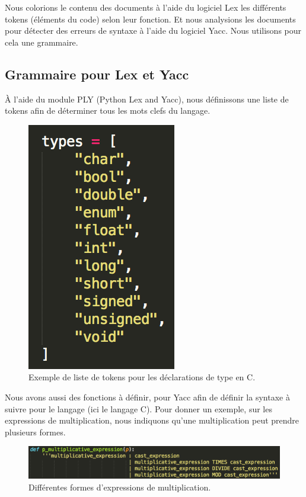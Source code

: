 \documentclass[a4paper,12pt]{article}
\begin{document}
	Nous colorions le contenu des documents à l'aide du logiciel Lex les différents tokens (éléments du code) selon leur fonction. Et nous analysions les documents pour détecter des erreurs de syntaxe à l'aide du logiciel Yacc. Nous utilisons pour cela une grammaire.
	
	\subsection{Grammaire pour Lex et Yacc}
	
		À l'aide du module PLY (Python Lex and Yacc), nous définissons une liste de tokens afin de déterminer tous les mots clefs du langage.
		
		\begin{figure}[!h]
			\begin{center}
				\includegraphics[scale=0.7]{images/tokens}
				\caption{Exemple de liste de tokens pour les déclarations de type en C.}
			\end{center}
		\end{figure}
		
		Nous avons aussi des fonctions à définir, pour Yacc afin de définir la syntaxe à suivre pour le langage (ici le langage C).
		Pour donner un exemple, sur les expressions de multiplication, nous indiquons qu'une multiplication peut prendre plusieurs formes.
		
		\begin{figure}[!h]
			\begin{center}
				\includegraphics[scale=0.7]{images/yacc1}
				\caption{Différentes formes d'expressions de multiplication.}
			\end{center}
		\end{figure}
		
\end{document}
